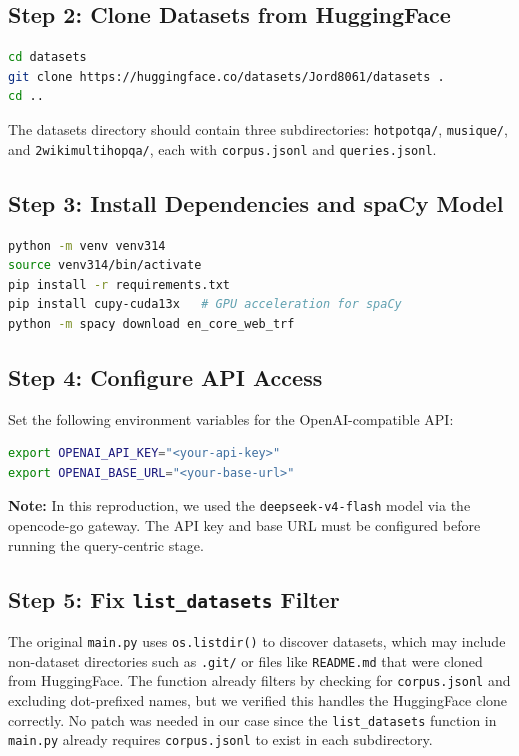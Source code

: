 \documentclass[11pt,a4paper]{article}
\begin{document}
\subsection{Step 2: Clone Datasets from HuggingFace}

\begin{lstlisting}[language=bash]
cd datasets
git clone https://huggingface.co/datasets/Jord8061/datasets .
cd ..
\end{lstlisting}

The datasets directory should contain three subdirectories:
\texttt{hotpotqa/}, \texttt{musique/}, and \texttt{2wikimultihopqa/},
each with \texttt{corpus.jsonl} and \texttt{queries.jsonl}.

\subsection{Step 3: Install Dependencies and spaCy Model}

\begin{lstlisting}[language=bash]
python -m venv venv314
source venv314/bin/activate
pip install -r requirements.txt
pip install cupy-cuda13x   # GPU acceleration for spaCy
python -m spacy download en_core_web_trf
\end{lstlisting}

\subsection{Step 4: Configure API Access}

Set the following environment variables for the OpenAI-compatible API:

\begin{lstlisting}[language=bash]
export OPENAI_API_KEY="<your-api-key>"
export OPENAI_BASE_URL="<your-base-url>"
\end{lstlisting}

\textbf{Note:} In this reproduction, we used the \texttt{deepseek-v4-flash} model
via the opencode-go gateway.  The API key and base URL must be configured before
running the query-centric stage.

\subsection{Step 5: Fix \texttt{list\_datasets} Filter}

The original \texttt{main.py} uses \texttt{os.listdir()} to discover datasets,
which may include non-dataset directories such as \texttt{.git/} or files like
\texttt{README.md} that were cloned from HuggingFace.  The function already filters
by checking for \texttt{corpus.jsonl} and excluding dot-prefixed names, but we
verified this handles the HuggingFace clone correctly.  No patch was needed in our
case since the \texttt{list\_datasets} function in \texttt{main.py} already
requires \texttt{corpus.jsonl} to exist in each subdirectory.
\end{document}
